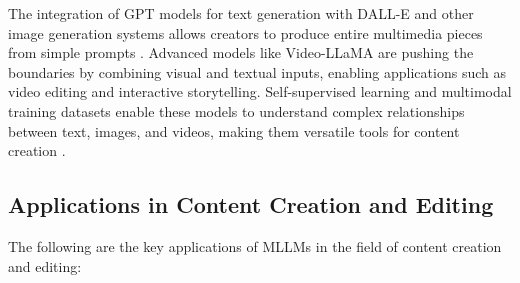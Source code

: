 The integration of GPT models for text generation with DALL-E and other image generation systems allows creators to produce entire multimedia pieces from simple prompts \cite{vs2024chang}. Advanced models like Video-LLaMA are pushing the boundaries by combining visual and textual inputs, enabling applications such as video editing and interactive storytelling. Self-supervised learning and multimodal training datasets enable these models to understand complex relationships between text, images, and videos, making them versatile tools for content creation \cite{vs2024song}.

\subsection{Applications in Content Creation and Editing}

The following are the key applications of MLLMs in the field of content creation and editing:

